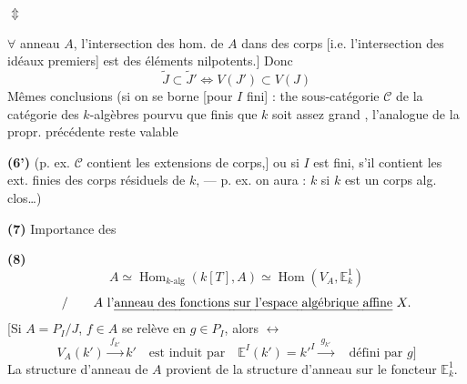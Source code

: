 \documentclass[11pt,a4paper]{article}
\begin{document}
$\Updownarrow$

$\forall$ anneau $A$, l'intersection des hom. de $A$ dans des corps [i.e. l'intersection des idéaux premiers] est  des éléments nilpotents.] Donc
\[
\widetilde{J} \subset \widetilde{J}' \Longleftrightarrow V(J') \subset V(J)
\]
Mêmes conclusions (si on se borne [pour $I$ fini] : the sous-catégorie $\mathcal{C}$ de la catégorie des $k$-algèbres  pourvu que \ill{} \ill{} finis que $k$ soit assez grand \ill{}, l'analogue de la propr. précédente reste valable

\textbf{(6')} (p. ex. $\mathcal{C}$ contient les extensions de corps,] ou \struck{\ill{}} si $I$ est fini, s'il contient les ext. finies des corps résiduels de $k$, --- p. ex. on aura : $k$ si $k$ est un corps alg. clos…)

\textbf{(7)} Importance des \struck{\ill{}} \ill{}

\textbf{(8)}
\[
A \simeq \operatorname{Hom}_{k\text{-alg}}(k[T], A) \simeq \operatorname{Hom}(V_A, \mathbb{E}^1_k)
\]
\[
/ \qquad A \text{ l'\emph{anneau des fonctions sur l'espace algébrique affine}} \ X.
\]
[Si $A = P_I / J$, $f \in A$ se relève en $g \in P_I$, alors $\longleftrightarrow$
\[
V_A(k') \xrightarrow{\ f_{k'}\ } k' \quad \text{est induit par} \quad \mathbb{E}^I(k') = k'^I \xrightarrow{\ g_{k'}\ } \quad \text{défini par } g ]
\]
La structure d'anneau de $A$ provient de la structure d'anneau sur le foncteur $\mathbb{E}^1_k$.


\end{document}
